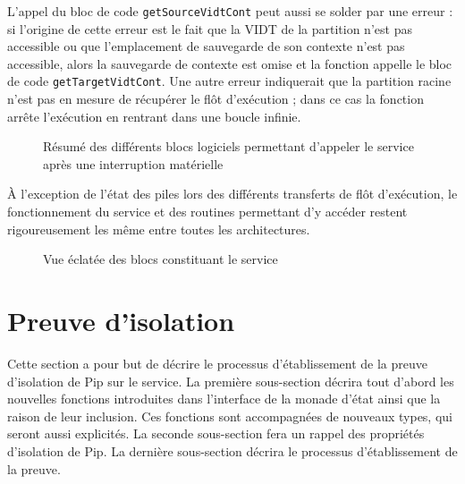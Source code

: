 		L'appel du bloc de code \texttt{getSourceVidtCont} peut aussi se solder par une erreur : si l'origine de cette erreur est le fait que la VIDT de la partition n'est pas accessible ou que l'emplacement de sauvegarde de son contexte n'est pas accessible, alors la sauvegarde de contexte est omise et la fonction appelle le bloc de code \texttt{getTargetVidtCont}. Une autre erreur indiquerait que la partition racine n'est pas en mesure de récupérer le flôt d'exécution ; dans ce cas la fonction arrête l'exécution en rentrant dans une boucle infinie.

		\begin{figure}[!ht]
			\centering
			
			\caption{Résumé des différents blocs logiciels permettant d'appeler le service après une interruption matérielle}
			\label{fig:interrupt_software}
		\end{figure}

		À l'exception de l'état des piles lors des différents transferts de flôt d'exécution, le fonctionnement du service et des routines permettant d'y accéder restent rigoureusement les même entre toutes les architectures. 
		\newpage

		\begin{figure}[!ht]
			
			\caption{Vue éclatée des blocs constituant le service}
			\label{fig:callgraph}
		\end{figure}
		\newpage
	\section{Preuve d'isolation}

		Cette section a pour but de décrire le processus d'établissement de la preuve d'isolation de Pip sur le service. La première sous-section décrira tout d'abord les nouvelles fonctions introduites dans l'interface de la monade d'état ainsi que la raison de leur inclusion. Ces fonctions sont accompagnées de nouveaux types, qui seront aussi explicités. La seconde sous-section fera un rappel des propriétés d'isolation de Pip. La dernière sous-section décrira le processus d'établissement de la preuve.\\

